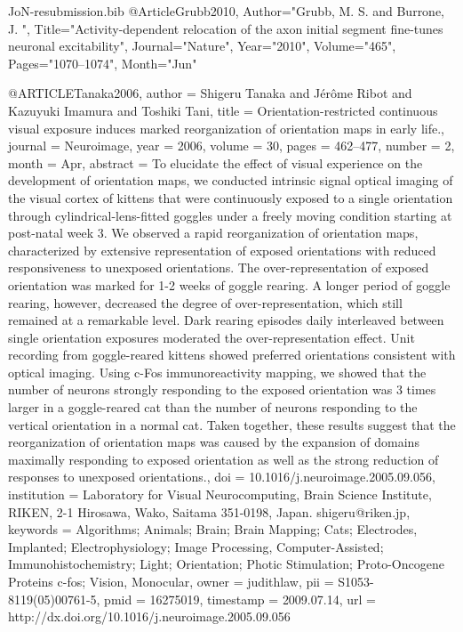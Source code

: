 \documentclass{article}
\begin{document}
\begin{filecontents}{JoN-resubmission.bib}
@Article{Grubb2010,
   Author="Grubb, M. S.  and Burrone, J. ",
   Title="{{A}ctivity-dependent relocation of the axon initial segment fine-tunes neuronal excitability}",
   Journal="Nature",
   Year="2010",
   Volume="465",
   Pages="1070--1074",
   Month="Jun"
}

@ARTICLE{Tanaka2006,
  author = {Shigeru Tanaka and J\'{e}r\^{o}me Ribot and Kazuyuki Imamura and Toshiki
	Tani},
  title = {Orientation-restricted continuous visual exposure induces marked
	reorganization of orientation maps in early life.},
  journal = {Neuroimage},
  year = {2006},
  volume = {30},
  pages = {462--477},
  number = {2},
  month = {Apr},
  abstract = {To elucidate the effect of visual experience on the development of
	orientation maps, we conducted intrinsic signal optical imaging of
	the visual cortex of kittens that were continuously exposed to a
	single orientation through cylindrical-lens-fitted goggles under
	a freely moving condition starting at post-natal week 3. We observed
	a rapid reorganization of orientation maps, characterized by extensive
	representation of exposed orientations with reduced responsiveness
	to unexposed orientations. The over-representation of exposed orientation
	was marked for 1-2 weeks of goggle rearing. A longer period of goggle
	rearing, however, decreased the degree of over-representation, which
	still remained at a remarkable level. Dark rearing episodes daily
	interleaved between single orientation exposures moderated the over-representation
	effect. Unit recording from goggle-reared kittens showed preferred
	orientations consistent with optical imaging. Using c-Fos immunoreactivity
	mapping, we showed that the number of neurons strongly responding
	to the exposed orientation was 3 times larger in a goggle-reared
	cat than the number of neurons responding to the vertical orientation
	in a normal cat. Taken together, these results suggest that the reorganization
	of orientation maps was caused by the expansion of domains maximally
	responding to exposed orientation as well as the strong reduction
	of responses to unexposed orientations.},
  doi = {10.1016/j.neuroimage.2005.09.056},
  institution = {Laboratory for Visual Neurocomputing, Brain Science Institute, RIKEN,
	2-1 Hirosawa, Wako, Saitama 351-0198, Japan. shigeru@riken.jp},
  keywords = {Algorithms; Animals; Brain; Brain Mapping; Cats; Electrodes, Implanted;
	Electrophysiology; Image Processing, Computer-Assisted; Immunohistochemistry;
	Light; Orientation; Photic Stimulation; Proto-Oncogene Proteins c-fos;
	Vision, Monocular},
  owner = {judithlaw},
  pii = {S1053-8119(05)00761-5},
  pmid = {16275019},
  timestamp = {2009.07.14},
  url = {http://dx.doi.org/10.1016/j.neuroimage.2005.09.056}
}


\end{filecontents}
\end{document}
